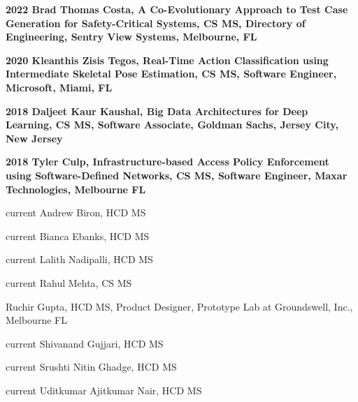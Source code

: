 \documentclass[12pt,letterpaper]{report}
\newcommand{\listitemspace}{0.25em}
\renewenvironment{itemize}
{\begin{list}{}{\setlength{\leftmargin}{0em}
                \setlength{\parskip}{0em}
                \setlength{\itemsep}{\listitemspace}
                \setlength{\parsep}{\listitemspace}}}
{\end{list}}
\begin{document}
    \begin{itemize}
        \item \textbf{2022 Brad Thomas Costa, A Co-Evolutionary Approach to Test Case Generation for Safety-Critical Systems, CS MS, Directory of Engineering, Sentry View Systems, Melbourne, FL}
        \item \textbf{2020 Kleanthis Zisis Tegos, Real-Time Action Classification using Intermediate Skeletal Pose Estimation, CS MS, Software Engineer, Microsoft, Miami, FL}
        \item \textbf{2018 Daljeet Kaur Kaushal, Big Data Architectures for Deep Learning, CS MS, Software Associate, Goldman Sachs, Jersey City, New Jersey}
        \item \textbf{2018 Tyler Culp, Infrastructure-based Access Policy Enforcement using Software-Defined Networks, CS MS, Software Engineer, Maxar Technologies, Melbourne FL}
        \item current Andrew Biron, HCD MS
        \item current Bianca Ebanks, HCD MS
        \item current Lalith Nadipalli, HCD MS
        \item current Rahul Mehta, CS MS
        \item Ruchir Gupta, HCD MS, Product Designer, Prototype Lab at Groundswell, Inc., Melbourne FL
        \item current Shivanand Gujjari, HCD MS
        \item current Srushti Nitin Ghadge, HCD MS
        \item current Uditkumar Ajitkumar Nair, HCD MS
    \end{itemize}
\end{document}
